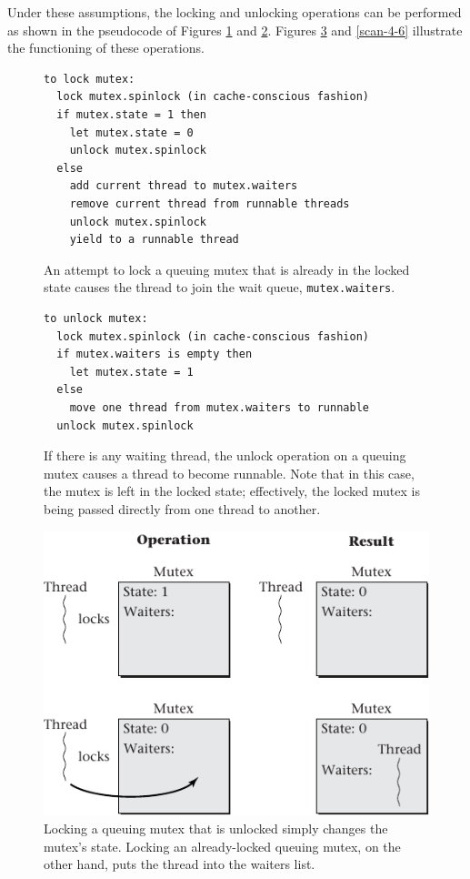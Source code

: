 Under these assumptions, the locking and unlocking operations can be
performed as shown in the pseudocode of Figures \ref{lock-pseudo-code} and
\ref{unlock-pseudo-code}.  Figures \ref{scan-4-5} and \ref{scan-4-6}
illustrate the functioning of these operations.
\begin{figure}
\begin{verbatim}
to lock mutex:
  lock mutex.spinlock (in cache-conscious fashion)
  if mutex.state = 1 then
    let mutex.state = 0
    unlock mutex.spinlock
  else
    add current thread to mutex.waiters
    remove current thread from runnable threads
    unlock mutex.spinlock
    yield to a runnable thread
\end{verbatim}
\caption{An attempt to lock a queuing mutex that is already in the
  locked state causes the thread to join the wait queue, {\tt mutex.waiters}.}
\label{lock-pseudo-code}
\end{figure}
\begin{figure}
\begin{verbatim}
to unlock mutex:
  lock mutex.spinlock (in cache-conscious fashion)
  if mutex.waiters is empty then
    let mutex.state = 1
  else
    move one thread from mutex.waiters to runnable
  unlock mutex.spinlock
\end{verbatim}
\caption{If there is any waiting thread, the unlock operation on a queuing mutex causes a thread to become
  runnable. Note that in this case, the mutex is left in the locked
  state; effectively, the locked mutex is being passed directly from
  one thread to another.}
\label{unlock-pseudo-code}
\end{figure}
\begin{figure}
\centerline{\includegraphics{hail_f0412}}
\caption{Locking a queuing mutex that is unlocked simply changes the
  mutex's state.  Locking an already-locked queuing mutex, on the
  other hand, puts the thread into the waiters list.}
\label{scan-4-5}
\end{figure}
